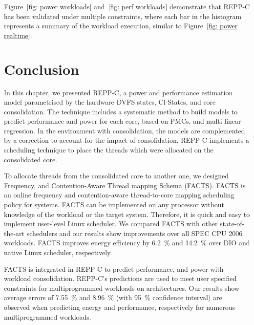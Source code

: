 Figure~\ref{fig: power workloads} and~\ref{fig: perf workloads} demonstrate that REPP-C
has been validated under multiple constraints, where each bar in the histogram represents
a summary of the workload execution, similar to Figure~\ref{fig: power realtime}.

\newpage




\section{Conclusion}
\label{sec: reppcconclusion}

In this chapter, we presented REPP-C, a power and performance estimation model
parametrised by the hardware DVFS states, Cl-States, and core consolidation.  The
technique includes a systematic method to build models to predict performance and power
for each core, based on PMCs, and multi linear regression.  In the \muc environment with
consolidation, the \muc models are complemented by a correction to account for the impact
of consolidation. REPP-C implements a scheduling technique to place the threads which were
allocated on the consolidated core. 

 To allocate threads from the consolidated core to another one, we designed
Frequency, and Contention-Aware Thread mapping Schema (FACTS). FACTS is an online
frequency and contention-aware thread-to-core mapping scheduling policy for \muc systems.
FACTS can be implemented on any \muc processor without knowledge of the workload or the
target system.  Therefore, it is quick and easy to implement user-level Linux scheduler.
We compared FACTS with other state-of-the-art schedulers and our results show improvements
over all SPEC CPU 2006 workloads. FACTS improves energy efficiency by \SI{6.2}{\percent}
and \SI{14.2}{\percent} over DIO and native Linux scheduler, respectively.

FACTS is integrated in REPP-C to predict performance, and power with workload
consolidation. REPP-C's predictions are used to meet user specified constraints for
multiprogrammed workloads on \muc architectures. Our results show average errors of
\SI{7.55}{\percent} and \SI{8.96}{\percent} (with \SI{95}{\percent} confidence interval)
are observed when predicting energy and performance, respectively for numerous
multiprogrammed workloads. \newline
